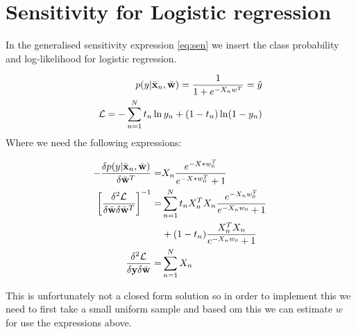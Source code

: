 \section{Sensitivity for Logistic regression}

In the generalised sensitivity expression \eqref{eq:sen} we insert the class probability and log-likelihood for logistic regression.

\begin{align*}
p(y|\bar{{\bf x}}_n,\bar{{\bf w}}) = \frac{1}{1+ e^{-X_nw^T}} = \hat{y}\\
\mathcal{L} = - \sum_{n=1}^{N} t_n \ln y_n + (1-t_n)\ln(1-y_n) \\
\end{align*}
Where we need the following expressions:

\begin{align*}
- \frac{\delta p(y|\bar{{\bf x}}_n,\bar{{\bf w}})}{\delta \bar{{\bf w}}^T}=&
X_n\frac{e^{-X*w_0^T}}{e^{-X*w_0^T}+1}\\
 \left[ \frac{\delta^2 \mathcal{L}}{\delta \bar{{\bf w}} \delta \bar{{\bf w}}^T} \right]^{-1}=&
 \sum_{n=1}^{N}  t_n X_n^T X_n \frac{e^{-X_n w_0^T}}{e^{-X_nw_0}+1}\\&+(1-t_n) \frac{X_n^T X_n}{e^{-X_nw_0}+1}\\
 \frac{\delta^2 \mathcal{L}}{\delta {\bf y} \delta \bar{{\bf w}}}=& \sum_{n=1}^{N} X_n
\end{align*}

This is unfortunately not a closed form solution so in order to implement this we need to first take a small uniform sample and based om this we can estimate $w$ for use the expressions above. 

